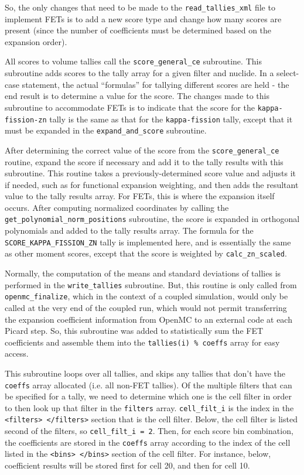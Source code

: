 \documentclass[10pt]{article}
\newcounter{subsubsubsection}[subsubsection]
\numberwithin{equation}{section} %
\begin{document}
So, the only changes that need to be made to the {\tt read\_tallies\_xml} file to implement FETs is to add a new score type and change how many scores are present (since the number of coefficients must be determined based on the expansion order).

All scores to volume tallies call the {\tt score\_general\_ce} subroutine. This subroutine adds scores to the tally array for a given filter and nuclide. In a select-case statement, the actual ``formulas'' for tallying different scores are held - the end result is to determine a value for the score. The changes made to this subroutine to accommodate FETs is to indicate that the score for the {\tt kappa-fission-zn} tally is the same as that for the {\tt kappa-fission} tally, except that it must be expanded in the {\tt expand\_and\_score} subroutine.

After determining the correct value of the score from the {\tt score\_general\_ce} routine, expand the score if necessary and add it to the tally results with this subroutine. This routine takes a previously-determined score value and adjusts it if needed, such as for functional expansion weighting, and then adds the resultant value to the tally results array. For FETs, this is where the expansion itself occurs. After computing normalized coordinates by calling the {\tt get\_polynomial\_norm\_positions} subroutine, the score is expanded in orthogonal polynomials and added to the tally results array. The formula for the {\tt SCORE\_KAPPA\_FISSION\_ZN} tally is implemented here, and is essentially the same as other moment scores, except that the score is weighted by {\tt calc\_zn\_scaled}. 
			
Normally, the computation of the means and standard deviations of tallies is performed in the {\tt write\_tallies} subroutine. But, this routine is only called from {\tt openmc\_finalize}, which in the context of a coupled simulation, would only be called at the very end of the coupled run, which would not permit transferring the expansion coefficient information from OpenMC to an external code at each Picard step. So, this subroutine was added to statistically sum the FET coefficients and assemble them into the {\tt tallies(i) \% coeffs} array for easy access. 

This subroutine loops over all tallies, and skips any tallies that don't have the {\tt coeffs} array allocated (i.e. all non-FET tallies). Of the multiple filters that can be specified for a tally, we need to determine which one is the cell filter in order to then look up that filter in the {\tt filters} array. {\tt cell\_filt\_i} is the index in the {\tt <filters> </filters>} section that is the cell filter. Below, the cell filter is listed second of the filters, so {\tt cell\_filt\_i = 2}. Then, for each score bin combination, the coefficients are stored in the {\tt coeffs} array according to the index of the cell listed in the {\tt <bins> </bins>} section of the cell filter. For instance, below, coefficient results will be stored first for cell 20, and then for cell 10.
\end{document}
